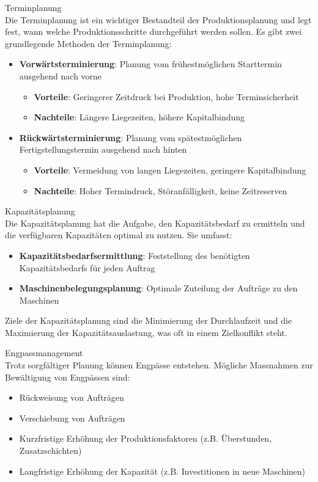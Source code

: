 \begin{definition}{Terminplanung}\\
Die Terminplanung ist ein wichtiger Bestandteil der Produktionsplanung und legt fest, wann welche Produktionsschritte durchgeführt werden sollen. Es gibt zwei grundlegende Methoden der Terminplanung:
\begin{itemize}
    \item \textbf{Vorwärtsterminierung}: Planung vom frühestmöglichen Starttermin ausgehend nach vorne
    \begin{itemize}
        \item \textbf{Vorteile}: Geringerer Zeitdruck bei Produktion, hohe Terminsicherheit
        \item \textbf{Nachteile}: Längere Liegezeiten, höhere Kapitalbindung
    \end{itemize}
    \item \textbf{Rückwärtsterminierung}: Planung vom spätestmöglichen Fertigstellungstermin ausgehend nach hinten
    \begin{itemize}
        \item \textbf{Vorteile}: Vermeidung von langen Liegezeiten, geringere Kapitalbindung
        \item \textbf{Nachteile}: Hoher Termindruck, Störanfälligkeit, keine Zeitreserven
    \end{itemize}
\end{itemize}
\end{definition}

\begin{definition}{Kapazitätsplanung}\\
Die Kapazitätsplanung hat die Aufgabe, den Kapazitätsbedarf zu ermitteln und die verfügbaren Kapazitäten optimal zu nutzen. Sie umfasst:
\begin{itemize}
    \item \textbf{Kapazitätsbedarfsermittlung}: Feststellung des benötigten Kapazitätsbedarfs für jeden Auftrag
    \item \textbf{Maschinenbelegungsplanung}: Optimale Zuteilung der Aufträge zu den Maschinen
\end{itemize}

Ziele der Kapazitätsplanung sind die Minimierung der Durchlaufzeit und die Maximierung der Kapazitätsauslastung, was oft in einem Zielkonflikt steht.
\end{definition}

\begin{concept}{Engpassmanagement}\\
Trotz sorgfältiger Planung können Engpässe entstehen. Mögliche Massnahmen zur Bewältigung von Engpässen sind:
\begin{itemize}
    \item Rückweisung von Aufträgen
    \item Verschiebung von Aufträgen
    \item Kurzfristige Erhöhung der Produktionsfaktoren (z.B. Überstunden, Zusatzschichten)
    \item Langfristige Erhöhung der Kapazität (z.B. Investitionen in neue Maschinen)
\end{itemize}
\end{concept}

